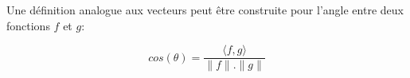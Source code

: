 Une définition analogue aux vecteurs peut être construite pour l'angle entre deux fonctions $f$ et $g$:

\begin{equation}
cos(\theta) = \frac{\langle f, g \rangle}{\|f\|.\|g\|}
\end{equation}

%
%
%
%
%
%
%
%
%
%
%
%
%
%
%
%
